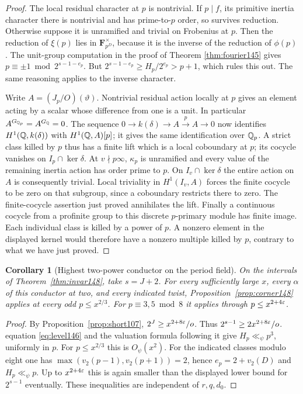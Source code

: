 \documentclass[a4paper,11pt]{article}
\newtheorem{corollary}[proposition]{Corollary}
\theoremstyle{definition}
\theoremstyle{remark}
\numberwithin{equation}{section}
\begin{document}
\begin{proof}
The local residual character at \(p\) is nontrivial. If
\(p\mid f\), its primitive inertia character there is
nontrivial and has prime-to-\(p\) order, so survives
reduction. Otherwise suppose it is unramified and trivial
on Frobenius at \(p\). Then the reduction of \(\xi(p)\)
lies in \(\mathbf F_{p^D}^\times\), because it is the inverse
of the reduction of \(\phi(p)\). The unit-group computation
in the proof of Theorem \ref{thm:fourier145} gives
\(p\equiv\pm1\bmod 2^{s-1-e_p}\). But
\(2^{s-1-e_p}\ge H_p/2^{e_p}>p+1\), which rules this out.
The same reasoning applies to the inverse character.

Write \(A=(J_p/O)(\vartheta)\). Nontrivial residual action
locally at \(p\) gives an element acting by a scalar whose
difference from one is a unit. In particular
\(A^{G_{\mathbb Q_p}}=A^{G_\mathbb Q}=0\).
The sequence \(0\to k(\delta)\to A\xrightarrow{p}A\to0\)
now identifies \(H^1(\mathbb Q,k(\delta))\) with \(H^1(\mathbb Q,A)[p]\);
it gives the same identification over \(\mathbb Q_p\). A strict
class killed by \(p\) thus has a finite lift which is a local
coboundary at \(p\); its cocycle vanishes on
\(I_p\cap\ker\delta\). At \(v\nmid p\infty\), \(\kappa_p\)
is unramified and every value of the remaining inertia action
has order prime to \(p\). On \(I_v\cap\ker\delta\) the entire
action on \(A\) is consequently trivial. Local triviality in
\(H^1(I_v,A)\) forces the finite cocycle to be zero on that
subgroup, since a coboundary restricts there to zero. The
finite-cocycle assertion just proved annihilates the lift.
Finally a continuous cocycle from a profinite group to this
discrete \(p\)-primary module has finite image. Each individual
class is killed by a power of \(p\). A nonzero element in the
displayed kernel would therefore have a nonzero multiple
killed by \(p\), contrary to what we have just proved.
\end{proof}

\begin{corollary}[Highest two-power conductor on the period field]
\label{cor:corner148}
On the intervals of Theorem~\ref{thm:invar148}, take
\(s=J+2\). For every sufficiently large \(x\), every
\(\alpha\) of this conductor at two, and every indicated
twist, Proposition~\ref{prop:corner148} applies at every
odd \(p\le x^{2/3}\). For \(p\equiv3,5\bmod8\) it applies
through \(p\le x^{2+4\varepsilon}\).
\end{corollary}
\begin{proof}
By Proposition~\ref{prop:short107}, \(2^J\ge
x^{2+8\varepsilon}/o\). Thus \(2^{s-1}\ge2x^{2+8\varepsilon}/o\).
equation \ref{eq:level146} and the valuation formula following it give
\(H_p\ll_\psi p^3\), uniformly in \(p\). For \(p\le x^{2/3}\)
this is \(O_\psi(x^2)\). For the indicated classes modulo
eight one has \(\max(v_2(p-1),v_2(p+1))=2\), hence
\(e_p=2+v_2(D)\) and \(H_p\ll_\psi p\). Up to
\(x^{2+4\varepsilon}\) this is again smaller than the displayed
lower bound for \(2^{s-1}\) eventually. These inequalities
are independent of \(r,q,d_0\).
\end{proof}
\end{document}
